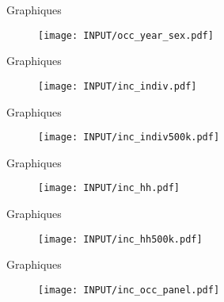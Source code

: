 \documentclass[aspectratio=169]{beamer}
\begin{document}
\begin{frame}[plain, shrink=2]{Graphiques}
\begin{figure}[htpb]
\centering
\texttt{[image: INPUT/occ\_year\_sex.pdf]}
\end{figure}
\end{frame}





\begin{frame}[plain, shrink=2]{Graphiques}
\begin{figure}[htpb]
\centering
\texttt{[image: INPUT/inc\_indiv.pdf]}
\end{figure}
\end{frame}


\begin{frame}[plain, shrink=2]{Graphiques}
\begin{figure}[htpb]
\centering
\texttt{[image: INPUT/inc\_indiv500k.pdf]}
\end{figure}
\end{frame}




\begin{frame}[plain, shrink=2]{Graphiques}
\begin{figure}[htpb]
\centering
\texttt{[image: INPUT/inc\_hh.pdf]}
\end{figure}
\end{frame}


\begin{frame}[plain, shrink=2]{Graphiques}
\begin{figure}[htpb]
\centering
\texttt{[image: INPUT/inc\_hh500k.pdf]}
\end{figure}
\end{frame}




\begin{frame}[plain, shrink=2]{Graphiques}
\begin{figure}[htpb]
\centering
\texttt{[image: INPUT/inc\_occ\_panel.pdf]}
\end{figure}
\end{frame}
\end{document}
